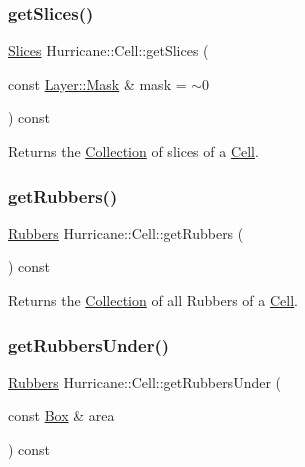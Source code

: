 \subsubsection{\texorpdfstring{get\+Slices()}{getSlices()}}
{\footnotesize\ttfamily \mbox{\hyperlink{namespaceHurricane_aa4a7e8a563c5687621eb5e57ade1706a}{Slices}} Hurricane\+::\+Cell\+::get\+Slices (\begin{DoxyParamCaption}\item[{const \mbox{\hyperlink{classHurricane_1_1Layer_af5277c670637bd5d910237e7afe01a91}{Layer\+::\+Mask}} \&}]{mask = {\ttfamily $\sim$0} }\end{DoxyParamCaption}) const}

Returns the \mbox{\hyperlink{classHurricane_1_1Collection}{Collection}} of slices of a \mbox{\hyperlink{classHurricane_1_1Cell}{Cell}}. \mbox{\label{classHurricane_1_1Cell_a56395a189898d5ae2a869d5a5d5dfdbe}} 
\subsubsection{\texorpdfstring{get\+Rubbers()}{getRubbers()}}
{\footnotesize\ttfamily \mbox{\hyperlink{namespaceHurricane_af8923abd57508cc44931a00d61b564ad}{Rubbers}} Hurricane\+::\+Cell\+::get\+Rubbers (\begin{DoxyParamCaption}{ }\end{DoxyParamCaption}) const}

Returns the \mbox{\hyperlink{classHurricane_1_1Collection}{Collection}} of all Rubbers of a \mbox{\hyperlink{classHurricane_1_1Cell}{Cell}}. \mbox{\label{classHurricane_1_1Cell_a58c6e24401d15f375547ad95b5c2c27c}} 
\subsubsection{\texorpdfstring{get\+Rubbers\+Under()}{getRubbersUnder()}}
{\footnotesize\ttfamily \mbox{\hyperlink{namespaceHurricane_af8923abd57508cc44931a00d61b564ad}{Rubbers}} Hurricane\+::\+Cell\+::get\+Rubbers\+Under (\begin{DoxyParamCaption}\item[{const \mbox{\hyperlink{classHurricane_1_1Box}{Box}} \&}]{area }\end{DoxyParamCaption}) const}

